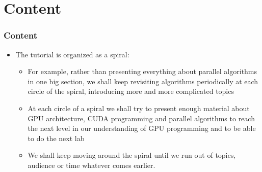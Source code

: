 
\section{Content}
\begin{frame}[fragile]
  \frametitle{Content}

\begin{itemize}
\item The tutorial is organized as a spiral: 
  \begin{itemize}
    \item For example, rather than presenting everything about parallel algorithms in one big section, we shall keep revisiting algorithms periodically at each circle of the spiral, introducing more and more complicated
      topics
    \item At each circle of a spiral we shall try to present enough material about GPU architecture, CUDA programming and parallel algorithms to reach the next level in our understanding of GPU programming and to be able to do 
      the next lab
    \item We shall keep moving around the spiral until we run out of topics, audience or time whatever comes earlier.
  \end{itemize}
\end{itemize}
\end{frame}



